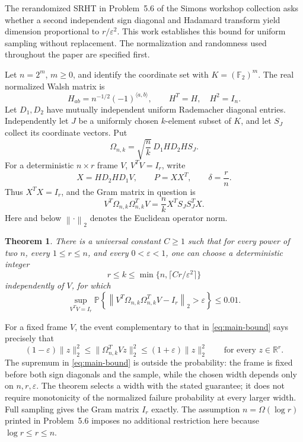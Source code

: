 \documentclass[11pt]{article}
\newtheorem{theorem}{Theorem}
\theoremstyle{definition}
\theoremstyle{remark}
\theoremstyle{plain}
\newcommand{\Prob}{\mathbb P}
\newcommand{\F}{\mathbb F}
\newcommand{\R}{\mathbb R}
\newcommand{\norm}[1]{\left\lVert#1\right\rVert_2}
\begin{document}
The rerandomized SRHT in Problem~5.6 of the Simons workshop collection
\cite[Definitions~5.1 and~5.3, Problem~5.6]{workshop} asks whether a
second independent sign diagonal and Hadamard transform yield
dimension proportional to $r/\varepsilon^2$. This work establishes this bound
for uniform sampling without replacement. The normalization and randomness
used throughout the paper are specified first.

Let \(n=2^m\), \(m\ge0\), and identify the coordinate set with
\(K=(\F_2)^m\). The real normalized Walsh matrix is
\[
 H_{ab}=n^{-1/2}(-1)^{\langle a,b\rangle},\qquad H^T=H,\quad H^2=I_n.
\]
Let \(D_1,D_2\) have mutually independent uniform Rademacher diagonal
entries. Independently let \(J\) be a uniformly chosen \(k\)-element
subset of \(K\), and let \(S_J\) collect its coordinate vectors. Put
\[
 \Omega_{n,k}=\sqrt{\frac nk}\,D_1HD_2HS_J.
\]
For a deterministic \(n\times r\) frame \(V\), \(V^TV=I_r\), write
\[
 X=HD_2HD_1V,\qquad P=XX^T,\qquad \delta=\frac rn.
\]
Thus \(X^TX=I_r\), and the Gram matrix in question is
\begin{equation}\label{eq:sampled-gram}
 V^T\Omega_{n,k}\Omega_{n,k}^TV
   =\frac nk X^T S_JS_J^T X.
\end{equation}
Here and below $\norm{\cdot}$ denotes the Euclidean operator norm.

\begin{theorem}\label{thm:main}
There is a universal constant \(C\ge1\) such that for every power of
two \(n\), every \(1\le r\le n\), and every \(0<\varepsilon<1\), one can
choose a deterministic integer
\[
 r\le k\le\min\{n,\lceil Cr/\varepsilon^2\rceil\}
\]
independently of \(V\), for which
\begin{equation}\label{eq:main-bound}
 \sup_{V^TV=I_r}
 \Prob\!\left\{\norm{V^T\Omega_{n,k}\Omega_{n,k}^TV-I_r}
                      >\varepsilon\right\}\le0.01.
\end{equation}
\end{theorem}

For a fixed frame $V$, the event complementary to that in
\eqref{eq:main-bound} says precisely that
\[
 (1-\varepsilon)\|z\|_2^2
 \le \|\Omega_{n,k}^T Vz\|_2^2
 \le (1+\varepsilon)\|z\|_2^2
 \qquad\text{for every }z\in\R^r.
\]
The supremum in \eqref{eq:main-bound} is outside the probability:
the frame is fixed before both sign diagonals and the sample, while
the chosen width depends only on $n,r,\varepsilon$. The theorem
selects a width with the stated guarantee; it does not require
monotonicity of the normalized failure probability at every larger
width. Full sampling gives the Gram matrix $I_r$ exactly.
The assumption $n=\Omega(\log r)$ printed in Problem~5.6 imposes no
additional restriction here because $\log r\le r\le n$.
\end{document}
